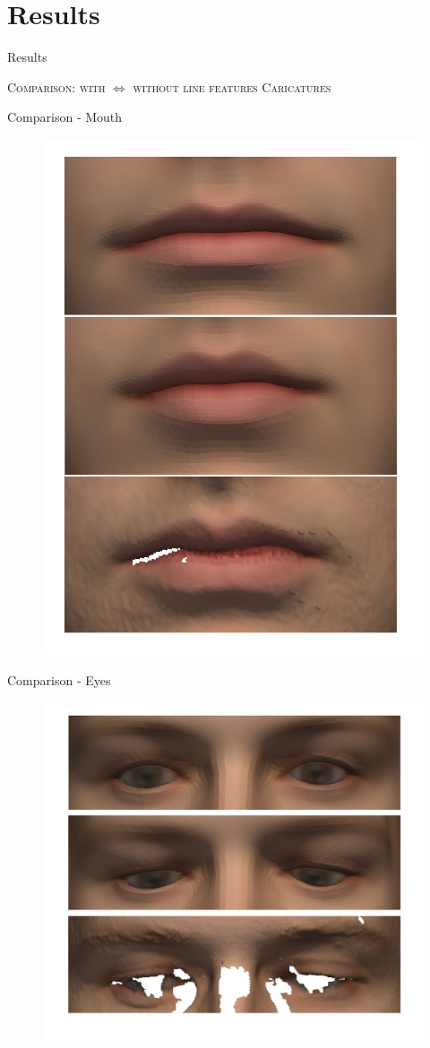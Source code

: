 \documentclass[xcolor=x11names,compress]{beamer}
\begin{document}
\section{Results}
\begin{frame}{Results}
\begin{center}
    {\scshape Comparison: with $\Leftrightarrow$ without line features}
    \vfill
    {\scshape Caricatures}
\end{center}
\end{frame}

\begin{frame}{Comparison - Mouth}
    \begin{figure}
        \centering
        \includegraphics[width=.5\textwidth]{../resources/img/00029_mouth_comparison.pdf}
    \end{figure}
\end{frame}
\begin{frame}{Comparison - Eyes}
    \begin{figure}
        \centering
        \includegraphics[width=.8\textwidth]{../resources/img/00029_eyes_comparison.pdf}
    \end{figure}
\end{frame}
\end{document}

